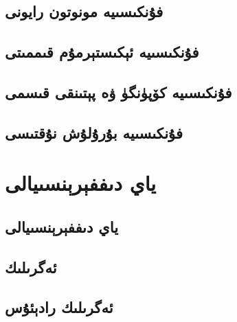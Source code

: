 \subsection{فۇنكىسىيە مونوتون رايونى}
\subsection{فۇنكىسىيە ئېكىستېرمۇم قىممىتى}
\subsection{فۇنكىسىيە كۆپۈنگۈ ۋە پېتىنقى قىسمى}
\subsection{فۇنكىسىيە بۇرۇلۇش نۇقتىسى}

\section{ياي دىففېرېنسىيالى}
\subsection{ياي دىففېرېنسىيالى}
\subsection{ئەگرىلىك}
\subsection{ئەگرىلىك رادېئۇس}
